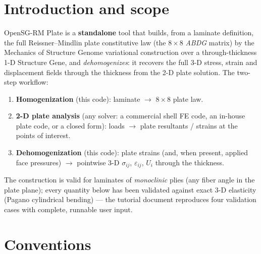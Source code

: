 \documentclass[11pt]{article}
\begin{document}
\section{Introduction and scope}
OpenSG-RM Plate is a \textbf{standalone} tool that builds, from a
laminate definition, the full Reissner--Mindlin plate constitutive law
(the $8\times8$ \emph{ABDG} matrix) by the Mechanics of Structure
Genome variational construction over a through-thickness 1-D Structure
Gene, and \emph{dehomogenizes}: it recovers the full 3-D stress,
strain and displacement fields through the thickness from the 2-D
plate solution.  The two-step workflow:
\begin{enumerate}
\item \textbf{Homogenization} (this code): laminate $\rightarrow$
  $8\times8$ plate law.
\item \textbf{2-D plate analysis} (any solver: a commercial shell FE
  code, an in-house plate code, or a closed form): loads $\rightarrow$
  plate resultants / strains at the points of interest.
\item \textbf{Dehomogenization} (this code): plate strains (and, when
  present, applied face pressures) $\rightarrow$ pointwise 3-D
  $\sigma_{ij}$, $\varepsilon_{ij}$, $U_i$ through the thickness.
\end{enumerate}
The construction is valid for laminates of \emph{monoclinic} plies
(any fiber angle in the plate plane); every quantity below has been
validated against exact 3-D elasticity (Pagano cylindrical bending)
--- the tutorial document reproduces four validation cases with
complete, runnable user input.

\section{Conventions}
\end{document}
